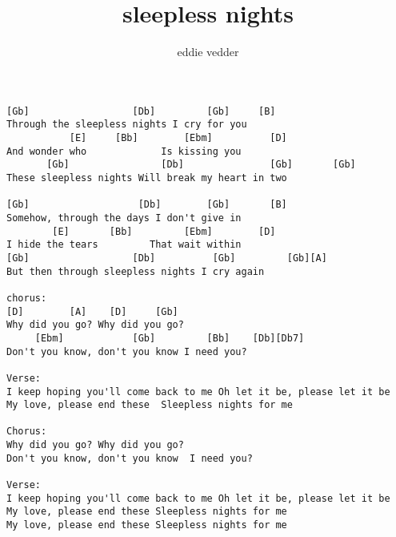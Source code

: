 \author{eddie vedder}
\title{sleepless nights}
\maketitle
\begin{verbatim}
[Gb]                  [Db]         [Gb]     [B]
Through the sleepless nights I cry for you
           [E]     [Bb]        [Ebm]          [D]
And wonder who             Is kissing you
       [Gb]                [Db]               [Gb]       [Gb]
These sleepless nights Will break my heart in two

[Gb]                   [Db]        [Gb]       [B]
Somehow, through the days I don't give in
        [E]       [Bb]         [Ebm]        [D]
I hide the tears         That wait within
[Gb]                  [Db]          [Gb]         [Gb][A]
But then through sleepless nights I cry again

chorus:
[D]        [A]    [D]     [Gb]
Why did you go? Why did you go?
     [Ebm]            [Gb]         [Bb]    [Db][Db7]
Don't you know, don't you know I need you?

Verse:
I keep hoping you'll come back to me Oh let it be, please let it be
My love, please end these  Sleepless nights for me

Chorus:
Why did you go? Why did you go?
Don't you know, don't you know  I need you?

Verse:
I keep hoping you'll come back to me Oh let it be, please let it be
My love, please end these Sleepless nights for me
My love, please end these Sleepless nights for me
\end{verbatim}